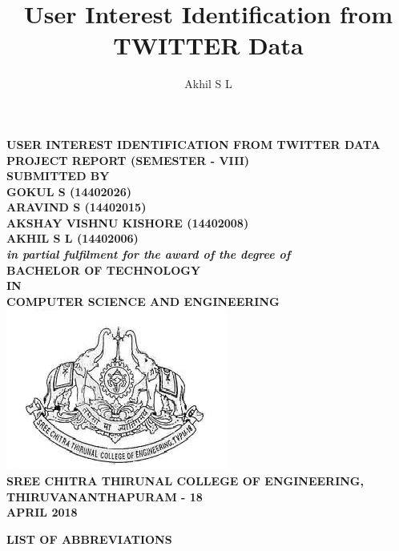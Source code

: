 \documentclass[a4paper,12pt]{report}
\title{User Interest Identification from TWITTER Data}
\author{Akhil S L}
\begin{document}
	\begin{center}
		\textbf{
			{\LARGE USER INTEREST IDENTIFICATION FROM TWITTER DATA}
		}\\
		[\baselineskip] %
		\textbf{
			{\large PROJECT REPORT (SEMESTER - VIII)}
		}\\
		[\baselineskip]
		\textbf{
			{SUBMITTED BY}
		}\\
		[\baselineskip]
		\textbf{
			{\large GOKUL S (14402026)}\\
			{\large ARAVIND S (14402015)}\\
			{\large AKSHAY VISHNU KISHORE (14402008)}\\
			{\large AKHIL S L (14402006)}
		}\\
		[\baselineskip]
		\textbf{
		\textit{
			{in partial fulfilment for the award of the degree of}
		}		
		}\\
		[\baselineskip]
		\textbf{
			{\Large BACHELOR OF TECHNOLOGY}
		}\\
		[\baselineskip]
		\textbf{
			{\Large IN}
		}\\
		[\baselineskip]
		\textbf{
			{\Large COMPUTER SCIENCE AND ENGINEERING}
		}\\
		[\baselineskip]
		\includegraphics[width=0.6\linewidth]{SCTlogo.png}
		\label{fig:sctlogo}\\
		[\baselineskip]
		\textbf{
			{\large SREE CHITRA THIRUNAL COLLEGE OF ENGINEERING,}
		}\\
		\textbf{
			{\large THIRUVANANTHAPURAM - 18}
		}\\
		\textbf{
			{\large APRIL 2018}
		}\\
				
	\end{center}
	\newpage
	
	\newpage
	
	\newpage
	\renewcommand*\contentsname{
		\centering
			\textbf{\Large CONTENTS}
	}
	\tableofcontents
	\newpage
	\begin{center}
		\textbf{{\Large LIST OF ABBREVIATIONS}}\\
	\end{center}	
	
\end{document}
